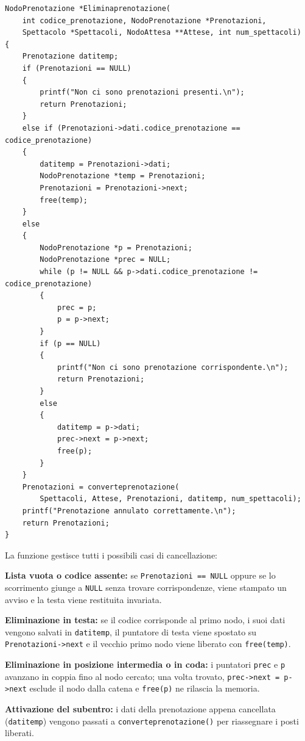 \documentclass[11pt,a4paper,oneside,openany]{book}
\newenvironment{listacomp}{%
    \small
    \begin{list}{\textendash}{%
        \setlength{\topsep}{2pt}%
        \setlength{\partopsep}{0pt}%
        \setlength{\itemsep}{1pt}%
        \setlength{\parsep}{0pt}%
        \setlength{\leftmargin}{1.2em}%
    }%
}{%
    \end{list}%
}
\begin{document}
\begin{lstlisting}[caption={Eliminazione di un nodo dalla lista delle prenotazioni}]
NodoPrenotazione *Eliminaprenotazione(
    int codice_prenotazione, NodoPrenotazione *Prenotazioni,
    Spettacolo *Spettacoli, NodoAttesa **Attese, int num_spettacoli)
{
    Prenotazione datitemp;
    if (Prenotazioni == NULL)
    {
        printf("Non ci sono prenotazioni presenti.\n");
        return Prenotazioni;
    }
    else if (Prenotazioni->dati.codice_prenotazione == codice_prenotazione)
    {
        datitemp = Prenotazioni->dati;
        NodoPrenotazione *temp = Prenotazioni;
        Prenotazioni = Prenotazioni->next;
        free(temp);
    }
    else
    {
        NodoPrenotazione *p = Prenotazioni;
        NodoPrenotazione *prec = NULL;
        while (p != NULL && p->dati.codice_prenotazione != codice_prenotazione)
        {
            prec = p;
            p = p->next;
        }
        if (p == NULL)
        {
            printf("Non ci sono prenotazione corrispondente.\n");
            return Prenotazioni;
        }
        else
        {
            datitemp = p->dati;
            prec->next = p->next;
            free(p);
        }
    }
    Prenotazioni = converteprenotazione(
        Spettacoli, Attese, Prenotazioni, datitemp, num_spettacoli);
    printf("Prenotazione annulato correttamente.\n");
    return Prenotazioni;
}
\end{lstlisting}

La funzione gestisce tutti i possibili casi di cancellazione:
\begin{listacomp}
    \item \textbf{Lista vuota o codice assente:} se \texttt{Prenotazioni == NULL} oppure se lo scorrimento giunge a \texttt{NULL} senza trovare corrispondenze, viene stampato un avviso e la testa viene restituita invariata.
    \item \textbf{Eliminazione in testa:} se il codice corrisponde al primo nodo, i suoi dati vengono salvati in \texttt{datitemp}, il puntatore di testa viene spostato su \texttt{Prenotazioni->next} e il vecchio primo nodo viene liberato con \texttt{free(temp)}.
    \item \textbf{Eliminazione in posizione intermedia o in coda:} i puntatori \texttt{prec} e \texttt{p} avanzano in coppia fino al nodo cercato; una volta trovato, \texttt{prec->next = p->next} esclude il nodo dalla catena e \texttt{free(p)} ne rilascia la memoria.
    \item \textbf{Attivazione del subentro:} i dati della prenotazione appena cancellata (\texttt{datitemp}) vengono passati a \texttt{converteprenotazione()} per riassegnare i posti liberati.
\end{listacomp}
\end{document}
